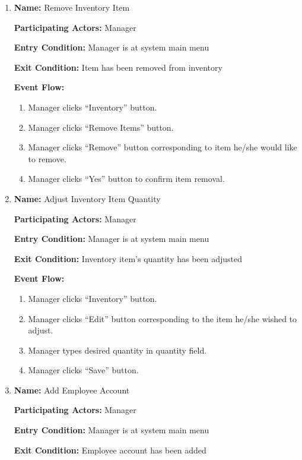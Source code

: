 \documentclass[11pt]{article}
\begin{document}
\begin{enumerate}
		\item \textbf{Name:} 				Remove Inventory Item

			\textbf{Participating Actors:} 	Manager

			\textbf{Entry Condition:} 		Manager is at system main menu

			\textbf{Exit Condition:} 		Item has been removed from inventory

			\textbf{Event Flow:}
			\begin{enumerate}
				\setlength{\leftskip}{1cm}
				\item Manager clicks ``Inventory'' button.
				\item Manager clicks ``Remove Items'' button.
				\item Manager clicks ``Remove'' button corresponding to item he/she would like to remove.
				\item Manager clicks ``Yes'' button to confirm item removal.\\
			\end{enumerate}

		\item \textbf{Name:} 				Adjust Inventory Item Quantity

			\textbf{Participating Actors:} 	Manager

			\textbf{Entry Condition:} 		Manager is at system main menu

			\textbf{Exit Condition:} 		Inventory item's quantity has been adjusted

			\textbf{Event Flow:}
			\begin{enumerate}
				\setlength{\leftskip}{1cm}
				\item Manager clicks ``Inventory'' button.
				\item Manager clicks ``Edit'' button corresponding to the item he/she wished to adjust.
				\item Manager types desired quantity in quantity field.
				\item Manager clicks ``Save'' button.\\
			\end{enumerate}

		\newpage

		\item \textbf{Name:} 				Add Employee Account

			\textbf{Participating Actors:} 	Manager

			\textbf{Entry Condition:} 		Manager is at system main menu

			\textbf{Exit Condition:} 		Employee account has been added


\end{enumerate}
\end{document}
